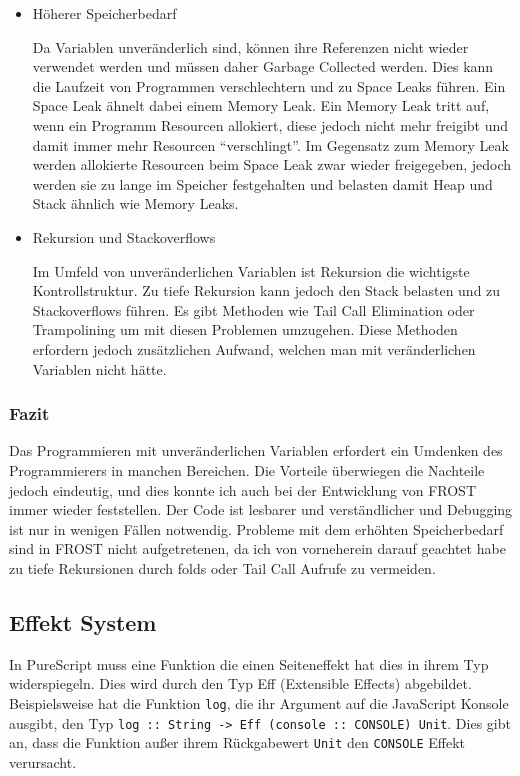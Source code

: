 \begin{itemize}
\item Höherer Speicherbedarf

  Da Variablen unveränderlich sind, können ihre Referenzen nicht wieder
  verwendet werden und müssen daher Garbage Collected werden. Dies kann die
  Laufzeit von Programmen verschlechtern und zu Space Leaks führen. Ein Space
  Leak ähnelt dabei einem Memory Leak. Ein Memory Leak tritt auf, wenn ein
  Programm Resourcen allokiert, diese jedoch nicht mehr freigibt und damit immer
  mehr Resourcen ``verschlingt''. Im Gegensatz zum Memory Leak werden allokierte
  Resourcen beim Space Leak zwar wieder freigegeben, jedoch werden sie zu lange
  im Speicher festgehalten und belasten damit Heap und Stack ähnlich wie Memory
  Leaks.
  
\item Rekursion und Stackoverflows

  Im Umfeld von unveränderlichen Variablen ist Rekursion die wichtigste
  Kontrollstruktur. Zu tiefe Rekursion kann jedoch den Stack belasten und zu
  Stackoverflows führen. Es gibt Methoden wie Tail Call Elimination oder
  Trampolining um mit diesen Problemen umzugehen. Diese Methoden erfordern
  jedoch zusätzlichen Aufwand, welchen man mit veränderlichen Variablen nicht
  hätte.
\end{itemize}
\subsubsection*{Fazit}
Das Programmieren mit unveränderlichen Variablen erfordert ein Umdenken des
Programmierers in manchen Bereichen. Die Vorteile überwiegen die Nachteile
jedoch eindeutig, und dies konnte ich auch bei der Entwicklung von FROST immer
wieder feststellen. Der Code ist lesbarer und verständlicher und Debugging ist
nur in wenigen Fällen notwendig. Probleme mit dem erhöhten Speicherbedarf sind
in FROST nicht aufgetretenen, da ich von vorneherein darauf geachtet habe zu
tiefe Rekursionen durch folds oder Tail Call Aufrufe zu vermeiden.

\subsection*{Effekt System}

In PureScript muss eine Funktion die einen Seiteneffekt hat dies in ihrem Typ
widerspiegeln. Dies wird durch den Typ Eff (Extensible Effects) abgebildet.
Beispielsweise hat die Funktion \texttt{log}, die ihr Argument auf die
JavaScript Konsole ausgibt, den Typ \texttt{log :: String -> Eff (console ::
  CONSOLE) Unit}. Dies gibt an, dass die Funktion außer ihrem Rückgabewert
\texttt{Unit} den \texttt{CONSOLE} Effekt verursacht.

